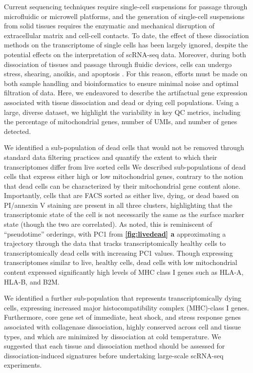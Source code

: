 Current sequencing techniques require single-cell suspensions for passage through microfluidic or microwell platforms, and the generation of single-cell suspensions from solid tissues requires the enzymatic and mechanical disruption of extracellular matrix and cell-cell contacts. To date, the effect of these dissociation methods on the transcriptome of single cells has been largely ignored, despite the potential effects on the interpretation of scRNA-seq data. Moreover, during both dissociation of tissues and passage through fluidic devices, cells can undergo stress, shearing, anoikis, and apoptosis \cite{aljanahi2018introduction}. For this reason, efforts must be made on both sample handling and bioinformatics to ensure minimal noise and optimal filtration of data. Here, we endeavored to describe the artifactual gene expression associated with tissue dissociation and dead or dying cell populations. Using a large, diverse dataset, we highlight the variability in key QC metrics, including the percentage of mitochondrial genes, number of UMIs, and number of genes detected. 

We identified a sub-population of dead cells that would not be removed through standard data filtering practices and quantify the extent to which their transcriptomes differ from live sorted cells
We described sub-populations of dead cells that express either high or low mitochondrial genes, contrary to the notion that dead cells can be characterized by their mitochondrial gene content alone. Importantly, cells that are FACS sorted as either live, dying, or dead based on PI/annexin V staining are present in all three clusters, highlighting that the transcriptomic state of the cell is not necessarily the same as the surface marker state (though the two are correlated). As noted, this is reminiscent of ``pseudotime'' orderings, with PC1 from \textbf{\autoref{fig:livedead} a}  approximating a trajectory through the data that tracks transcriptomically healthy cells to transcriptomically dead cells with increasing PC1 values. Though expressing transcriptomes similar to live, healthy cells, dead cells with low mitochondrial content expressed significantly high levels of MHC class I genes such as HLA-A, HLA-B, and B2M.

 We identified a further sub-population that represents transcriptomically dying cells, expressing increased major histocompatibility complex (MHC)-class I genes. Furthermore, core gene set of immediate, heat shock, and stress response genes associated with collagenase dissociation, highly conserved across cell and tissue types, and which are minimized by dissociation at cold temperature. We suggested that each tissue and dissociation method should be assessed for dissociation-induced signatures before undertaking large-scale scRNA-seq experiments.






